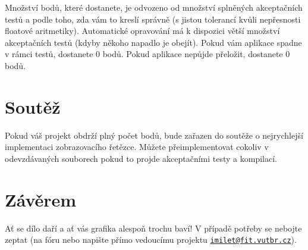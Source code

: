 Množství bodů, které dostanete, je odvozeno od množství splněných akceptačních testů a podle toho, zda vám to kreslí správně (s jistou tolerancí kvůli nepřesnosti floatové aritmetiky). Automatické opravování má k dispozici větší množství akceptačních testů (kdyby někoho napadlo je obejít). Pokud vám aplikace spadne v rámci testů, dostanete 0 bodů. Pokud aplikace nepůjde přeložit, dostanete 0 bodů.\hypertarget{index_soutez}{}\section{Soutěž}\label{index_soutez}
Pokud váš projekt obdrží plný počet bodů, bude zařazen do soutěže o nejrychlejší implementaci zobrazovacího řetězce. Můžete přeimplementovat cokoliv v odevzdávaných souborech pokud to projde akceptačními testy a kompilací.\hypertarget{index_zaver}{}\section{Závěrem}\label{index_zaver}
Ať se dílo daří a ať vás grafika alespoň trochu baví! V případě potřeby se nebojte zeptat (na fóru nebo napište přímo vedoucímu projektu \href{mailto:imilet@fit.vutbr.cz}{\tt imilet@fit.\-vutbr.\-cz}). 